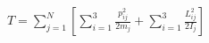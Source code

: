 \documentclass[preview]{standalone}
\begin{document}
\begin{align*}
T = \sum_{j=1}^N\left[ \sum_{i=1}^3\frac{p_{ij}^2}{2m_j} + \sum_{i=1}^3\frac{L_{ij}^2}{2I_j} \right]
\end{align*}
\end{document}
